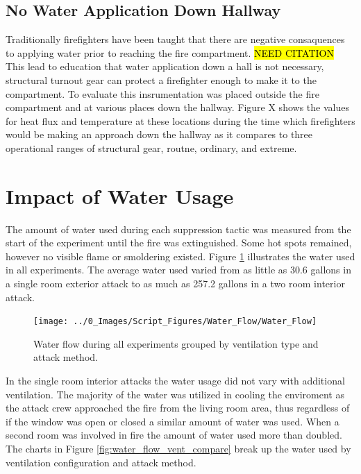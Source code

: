 \documentclass[12pt,oneside]{book}
\begin{document}

\subsection{No Water Application Down Hallway}
Traditionally firefighters have been taught that there are negative consaquences to applying water prior to reaching the fire compartment. \hl{NEED CITATION} This lead to education that water application down a hall is not necessary, structural turnout gear can protect a firefighter enough to make it to the compartment. To evaluate this insrumentation was placed outside the fire compartment and at various places down the hallway. Figure X shows the values for heat flux and temperature at these locations during the time which firefighters would be making an approach down the hallway as it compares to three operational ranges of structural gear, routne, ordinary, and extreme. 



\section{Impact of Water Usage}
The amount of water used during each suppression tactic was measured from the start of the experiment until the fire was extinguished. Some hot spots remained, however no visible flame or smoldering existed. Figure \ref{fig:water_flow_all} illustrates the water used in all experiments. The average water used varied from as little as 30.6 gallons in a single room exterior attack to as much as 257.2 gallons in a two room interior attack.

\begin{figure}[H]
\centering
\texttt{[image: ../0\_Images/Script\_Figures/Water\_Flow/Water\_Flow]}
\caption[Water Floor All Experiments]{Water flow during all experiments grouped by ventilation type and attack method.}
\label{fig:water_flow_all}
\end{figure}

In the single room interior attacks the water usage did not vary with additional ventilation. The majority of the water was utilized in cooling the enviroment as the attack crew approached the fire from the living room area, thus regardless of if the window was open or closed a similar amount of water was used. When a second room was involved in fire the amount of water used more than doubled. The charts in Figure \ref{fig:water_flow_vent_compare} break up the water used by ventilation configuration and attack method.  
\end{document}
